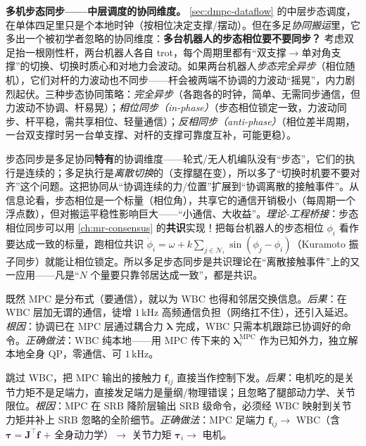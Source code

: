 \textbf{多机步态同步——中层调度的协同维度。} \cref{sec:dmpc-dataflow} 的中层步态调度，在单体四足里只是个本地时钟（按相位决定支撑/摆动）。但在多足\emph{协同搬运}里，它多出一个被初学者忽略的协同维度：\textbf{多台机器人的步态相位要不要同步？} 考虑双足抬一根刚性杆，两台机器人各自 trot，每个周期里都有“双支撑$\to$单对角支撑”的切换、切换时质心和对地力会波动。如果两台机器人\emph{步态完全异步}（相位随机），它们对杆的力波动也不同步——杆会被两端不协调的力波动“摇晃”，内力剧烈起伏。三种步态协同策略：\emph{完全异步}（各跑各的时钟，简单、无需同步通信，但力波动不协调、杆易晃）；\emph{相位同步（in-phase）}（步态相位锁定一致，力波动同步、杆平稳，需共享相位、轻量通信）；\emph{反相同步（anti-phase）}（相位差半周期，一台双支撑时另一台单支撑、对杆的支撑可靠度互补，可能更稳）。

\begin{insight}\label{ins:dmpc-gait-sync}
步态同步是多足协同\textbf{特有}的协调维度——轮式/无人机编队没有“步态”，它们的执行是连续的；多足执行是\emph{离散切换}的（支撑腿在变），所以多了“切换时机要不要对齐”这个问题。这把协同从“协调连续的力/位置”扩展到“协调离散的接触事件”。从信息论看，步态相位是一个标量（相位角），共享它的通信开销极小（每周期一个浮点数），但对搬运平稳性影响巨大——“小通信、大收益”。\emph{理论-工程桥接}：步态相位同步可以用 \cref{ch:mr-consensus} 的\textbf{共识}实现！把每台机器人的步态相位 $\phi_i$ 看作要达成一致的标量，跑相位共识 $\dot\phi_i=\omega+k\sum_{j\in\mathcal{N}_i}\sin(\phi_j-\phi_i)$（Kuramoto 振子同步）就能让相位锁定。所以多足步态同步是共识理论在“离散接触事件”上的又一应用——凡是“$N$ 个量要只靠邻居达成一致”，都是共识。
\end{insight}

\begin{pitfall}
既然 MPC 是分布式（要通信），就以为 WBC 也得和邻居交换信息。\emph{后果}：在 WBC 层加无谓的通信，徒增 $1$\,kHz 高频通信负担（网络扛不住），还引入延迟。\emph{根因}：协调已在 MPC 层通过耦合力 $\boldsymbol{\lambda}$ 完成，WBC 只需本机跟踪已协调好的命令。\emph{正确做法}：WBC 纯本地——用 MPC 传下来的 $\boldsymbol{\lambda}_i^{\text{MPC}}$ 作为已知外力，独立解本地全身 QP，零通信、可 $1$\,kHz。
\end{pitfall}

\begin{pitfall}
跳过 WBC，把 MPC 输出的接触力 $\mathbf{f}_{ij}$ 直接当作控制下发。\emph{后果}：电机吃的是关节力矩不是足端力，直接发足端力是量纲/物理错误；且忽略了腿部动力学、关节限位。\emph{根因}：MPC 在 SRB 降阶层输出 SRB 级命令，必须经 WBC 映射到关节力矩并补上 SRB 忽略的全阶细节。\emph{正确做法}：MPC 足端力 $\mathbf{f}_{ij}\to$ WBC（含 $\boldsymbol{\tau}=\mathbf{J}^\top\mathbf{f}$ $+$ 全身动力学）$\to$ 关节力矩 $\boldsymbol{\tau}_i\to$ 电机。
\end{pitfall}

